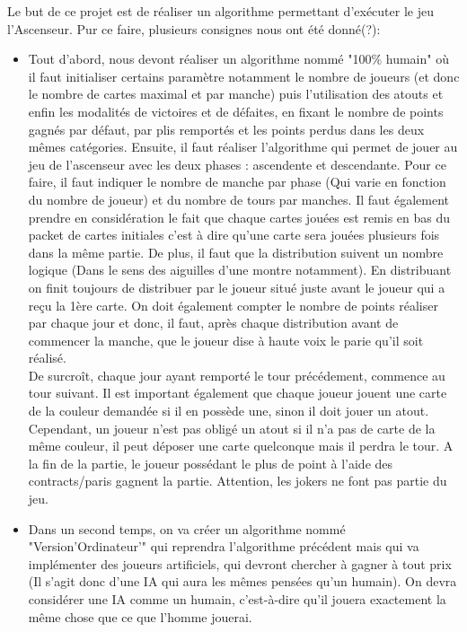 \documentclass[12pt]{report}
\begin{document}
	Le but de ce projet est de réaliser un algorithme permettant d'exécuter le jeu l'Ascenseur. Pur ce faire, plusieurs consignes nous ont été donné(?): 
	\begin{itemize}
		\item  {Tout d'abord, nous devont réaliser un algorithme nommé "100\% humain" où il faut 
		initialiser certains paramètre notamment le nombre de joueurs (et donc le nombre de cartes maximal et par manche) puis l'utilisation des atouts et enfin les modalités de victoires et de défaites, en fixant le nombre de points gagnés par défaut, par plis remportés et les points perdus dans les deux mêmes catégories. Ensuite, il faut réaliser l'algorithme qui permet de jouer au jeu de l'ascenseur avec les deux phases : ascendente et descendante. Pour ce faire, il faut indiquer le nombre de manche par phase (Qui varie en fonction du nombre de joueur) et du nombre de tours par manches. Il faut également prendre en considération le fait que chaque cartes jouées est remis en bas du packet de cartes initiales c'est à dire qu'une carte sera jouées plusieurs fois dans la même partie. De plus, il faut que la distribution suivent un nombre logique (Dans le sens des aiguilles d'une montre notamment). En distribuant on finit toujours de distribuer par le joueur situé juste avant le joueur qui a reçu la 1ère carte. On doit également compter le nombre de points réaliser par chaque jour et donc, il faut, après chaque distribution avant de commencer la manche, que le joueur dise à haute voix le parie qu'il soit réalisé. \\ De surcroît, chaque jour ayant remporté le tour précédement, commence au tour suivant. Il est important également que chaque joueur jouent une carte de la couleur demandée si il en possède une, sinon il doit jouer un atout. Cependant, un joueur n'est pas obligé un atout si il n'a pas de carte de la même couleur, il peut déposer une carte quelconque mais il perdra le tour.
A la fin de la partie, le joueur possédant le plus de point à l'aide des contracts/paris gagnent la partie.  Attention, les jokers ne font pas partie du jeu.}
		\item {Dans un second temps, on va créer un algorithme nommé "Version'Ordinateur'" qui reprendra l'algorithme précédent mais qui va implémenter des joueurs artificiels, qui devront chercher à gagner à tout prix (Il s'agit donc d'une IA qui aura les mêmes pensées qu'un humain). On devra considérer une IA comme un humain, c'est-à-dire qu'il jouera exactement la même chose que ce que l'homme jouerai. } \\
		\\
	\end{itemize}
	
\end{document}
